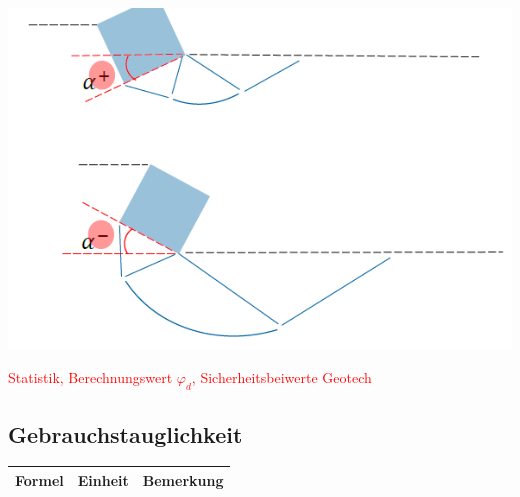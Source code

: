 \begin{minipage}{0.2\linewidth}
	\includegraphics[width=\linewidth]{images/Flachfun4Winkel.PNG} \\
	
\end{minipage}


\textcolor{red}{Statistik, Berechnungswert $ \varphi_d $, Sicherheitsbeiwerte Geotech}



	\begin{minipage}{\linewidth}
		\subsection{Gebrauchstauglichkeit}
	
	

	\end{minipage}



\begin{minipage}{\linewidth}
	\begin{tabular}{l|l|l}
		Formel			&	Einheit	&	Bemerkung \\ \hline
	\end{tabular}
\end{minipage}